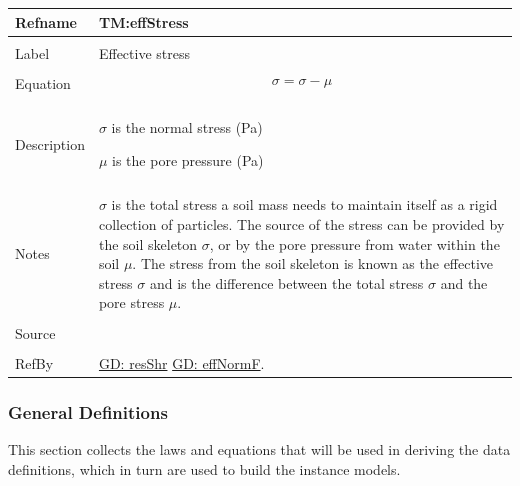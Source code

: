 \documentclass[12pt]{article}
\begin{document}
\noindent \begin{minipage}{\textwidth}
\begin{tabular}{p{} p{}}
\toprule \textbf{Refname} & \textbf{TM:effStress}
\label{TM:effStress}
\\ \midrule \\
Label & Effective stress
        \\ \midrule \\
        Equation & \begin{displaymath}
                   σ=σ-μ
                   \end{displaymath}
                   \\ \midrule \\
                   Description & \begin{symbDescription}
                                 \item{$σ$ is the normal stress (Pa)}
                                 \item{$μ$ is the pore pressure (Pa)}
                                 \end{symbDescription}
                                 \\ \midrule \\
                                 Notes & $σ$ is the total stress a soil mass needs to maintain itself as a rigid collection of particles. The source of the stress can be provided by the soil skeleton $σ$, or by the pore pressure from water within the soil $μ$. The stress from the soil skeleton is known as the effective stress $σ$ and is the difference between the total stress $σ$ and the pore stress $μ$.
                                         \\ \midrule \\
                                         Source & \cite{fredlund1977}
                                                  \\ \midrule \\
                                                  RefBy & \hyperref[GD:resShr]{GD: resShr} \hyperref[GD:effNormF]{GD: effNormF}.
\\ \bottomrule \end{tabular}
\end{minipage}
\subsubsection{General Definitions}
\label{Sec:GDs}
This section collects the laws and equations that will be used in deriving the data definitions, which in turn are used to build the instance models.
\par~
\end{document}
